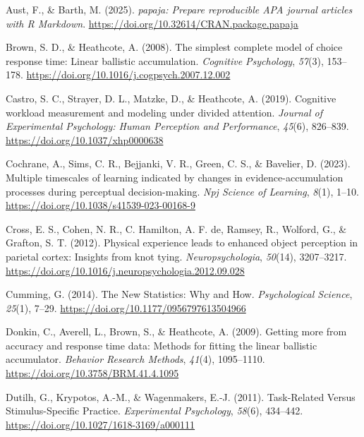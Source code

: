 \documentclass[
  english,
  man, donotrepeattitle,floatsintext]{apa6}
\newlength{\cslhangindent}
\newenvironment{CSLReferences}[2] %
 {\begin{list}{}{%
  \setlength{\itemindent}{0pt}
  \setlength{\leftmargin}{0pt}
  \setlength{\parsep}{0pt}
  \ifodd #1
   \setlength{\leftmargin}{\cslhangindent}
   \setlength{\itemindent}{-1\cslhangindent}
  \fi
  \setlength{\itemsep}{#2\baselineskip}}}
 {\end{list}}
\begin{document}
\label{refs}
\begin{CSLReferences}{1}{0}
Aust, F., \& Barth, M. (2025). \emph{{papaja}: {Prepare} reproducible {APA} journal articles with {R Markdown}}. \url{https://doi.org/10.32614/CRAN.package.papaja}

Brown, S. D., \& Heathcote, A. (2008). The simplest complete model of choice response time: {Linear} ballistic accumulation. \emph{Cognitive Psychology}, \emph{57}(3), 153--178. \url{https://doi.org/10.1016/j.cogpsych.2007.12.002}

Castro, S. C., Strayer, D. L., Matzke, D., \& Heathcote, A. (2019). Cognitive workload measurement and modeling under divided attention. \emph{Journal of Experimental Psychology: Human Perception and Performance}, \emph{45}(6), 826--839. \url{https://doi.org/10.1037/xhp0000638}

Cochrane, A., Sims, C. R., Bejjanki, V. R., Green, C. S., \& Bavelier, D. (2023). Multiple timescales of learning indicated by changes in evidence-accumulation processes during perceptual decision-making. \emph{Npj Science of Learning}, \emph{8}(1), 1--10. \url{https://doi.org/10.1038/s41539-023-00168-9}

Cross, E. S., Cohen, N. R., C. Hamilton, A. F. de, Ramsey, R., Wolford, G., \& Grafton, S. T. (2012). Physical experience leads to enhanced object perception in parietal cortex: {Insights} from knot tying. \emph{Neuropsychologia}, \emph{50}(14), 3207--3217. \url{https://doi.org/10.1016/j.neuropsychologia.2012.09.028}

Cumming, G. (2014). The {New Statistics}: {Why} and {How}. \emph{Psychological Science}, \emph{25}(1), 7--29. \url{https://doi.org/10.1177/0956797613504966}

Donkin, C., Averell, L., Brown, S., \& Heathcote, A. (2009). Getting more from accuracy and response time data: {Methods} for fitting the linear ballistic accumulator. \emph{Behavior Research Methods}, \emph{41}(4), 1095--1110. \url{https://doi.org/10.3758/BRM.41.4.1095}

Dutilh, G., Krypotos, A.-M., \& Wagenmakers, E.-J. (2011). Task-{Related Versus Stimulus-Specific Practice}. \emph{Experimental Psychology}, \emph{58}(6), 434--442. \url{https://doi.org/10.1027/1618-3169/a000111}


\end{CSLReferences}
\end{document}
